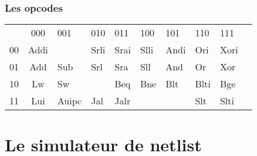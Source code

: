 \documentclass{beamer}
\begin{document}
	\begin{frame}
		\frametitle{Les opcodes}
			\def\arraystretch{2.5}
			\begin{tabular}{p{}||c*{8}{p{}}}
				& 000 & 001 & 010 & 011 & 100 & 101 & 110 & 111 \\
				\cline{1-9}
				00 & Addi & & Srli & Srai & Slli & Andi & Ori & Xori \\
				\cline{1-9}
				01 & Add & Sub & Srl & Sra & Sll & And & Or & Xor \\
				\cline{1-9}
				10 & Lw & Sw & & Beq & Bne & Blt & Blti & Bge \\
				\cline{1-9}
				11 & Lui & Auipc & Jal & Jalr & & & Slt & Slti \\
			\end{tabular}
	\end{frame}

	\section{Le simulateur de netlist}
	\begin{frame}

	\end{frame}
		
\end{document}
